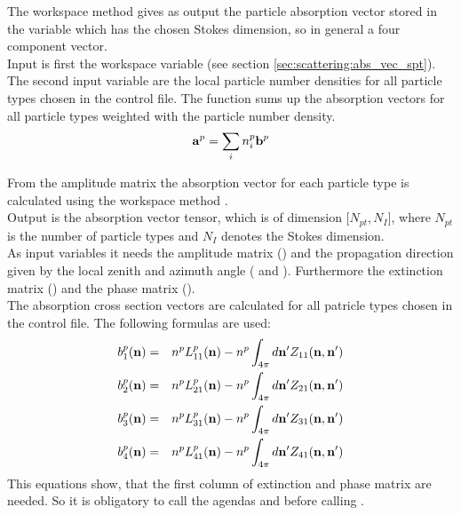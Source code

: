 \label{sec:scattering:abs_vec_part}

The workspace method  gives as output the
particle absorption vector  stored in the variable
 which has the chosen Stokes dimension, so in
general a four component vector.\\
Input is first the workspace variable  (see section
\ref{sec:scattering:abs_vec_spt}). The second input variable are the
local particle number densities  for all particle types
chosen in the control file.
The function sums up the absorption vectors for all particle types
weighted with the particle number density.
\begin{eqnarray}
  {\bf a}^{p} = \sum_i n^p_i {\bf b}^{p}
\end{eqnarray}


\label{sec:scattering:abs_vec_gas}


\label{sec:scattering:abs_vec_spt}

From the amplitude matrix the absorption vector for each
particle type is calculated using the workspace method
.\\
Output is the absorption vector tensor, which is  of  dimension
[$N_{pt}, N_{I}$], where $N_{pt}$ is the number of particle
types  and $N_{I}$ denotes the Stokes dimension.\\
As input variables it needs the amplitude matrix ()
and the propagation direction given by the local zenith and azimuth
angle ( and ). Furthermore the extinction
matrix () and the phase matrix
().\\
The absorption cross section vectors \SAbVec{} are
calculated for all patricle types chosen in the control
file. The following formulas are used:
\begin{eqnarray}
  \label{eq:gen_abs_vector}
  b^p_1({\bf n}) &=& n^p L^p_{11}({\bf n}) - n^p \int_{4\pi} d{\bf n'}
  Z_{11}({\bf n, n'})\\
  b^p_2({\bf n}) &=& n^p L^p_{21}({\bf n}) - n^p \int_{4\pi} d{\bf n'}
  Z_{21}({\bf n, n'})\\
  b^p_3({\bf n}) &=& n^p L^p_{31}({\bf n}) - n^p \int_{4\pi} d{\bf n'}
  Z_{31}({\bf n, n'})\\
  b^p_4({\bf n}) &=& n^p L^p_{41}({\bf n}) - n^p \int_{4\pi} d{\bf n'}
  Z_{41}({\bf n, n'})
\end{eqnarray}
This equations show, that the first column of extinction and phase
matrix are needed. So it is obligatory to call the agendas
 and 
 before calling
. 



